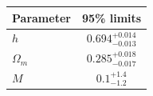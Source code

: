 \begin{tabular} { l  c}

 Parameter &  95\% limits\\
\hline
{\boldmath$h              $} & $0.694^{+0.014}_{-0.013}   $\\

{\boldmath$\Omega_m       $} & $0.285^{+0.018}_{-0.017}   $\\

{\boldmath$M              $} & $0.1^{+1.4}_{-1.2}         $\\
\hline
\end{tabular}